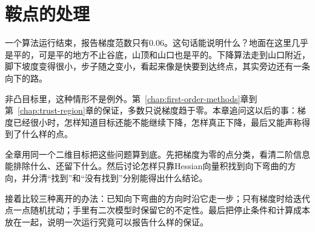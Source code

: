 \chapter{鞍点的处理}
\label{chap:saddle-points}

一个算法运行结束，报告梯度范数只有$0.06$。这句话能说明什么？地面在这里几乎是平的，可是平的地方不止谷底，山顶和山口也是平的。下降算法走到山口附近，脚下坡度变得很小，步子随之变小，看起来像是快要到达终点，其实旁边还有一条向下的路。

非凸目标里，这种情形不是例外。第~\ref{chap:first-order-methods}章到第~\ref{chap:trust-region}章的保证，多数只说梯度趋于零。本章追问这以后的事：梯度已经很小时，怎样知道目标还能不能继续下降，怎样真正下降，最后又能声称得到了什么样的点。

全章用同一个二维目标把这些问题算到底。先把梯度为零的点分类，看清二阶信息能排除什么、还留下什么。然后讨论怎样只靠Hessian向量积找到向下弯曲的方向，并分清“找到”和“没有找到”分别能得出什么结论。

接着比较三种离开的办法：已知向下弯曲的方向时沿它走一步；只有梯度时给迭代点一点随机扰动；手里有二次模型时保留它的不定性。最后把停止条件和计算成本放在一起，说明一次运行究竟可以报告什么样的保证。






